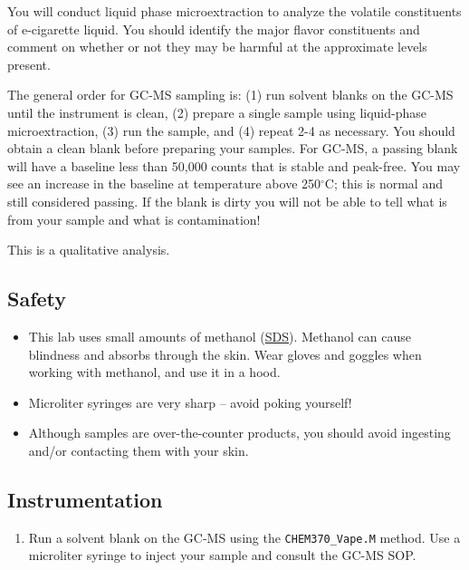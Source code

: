 \documentclass[]{tufte-book}
\providecommand{\tightlist}{%
  \setlength{\itemsep}{0pt}\setlength{\parskip}{0pt}}
\begin{document}
You will conduct liquid phase microextraction to analyze the volatile constituents of e-cigarette liquid. You should identify the major flavor constituents and comment on whether or not they may be harmful at the approximate levels present.

The general order for GC-MS sampling is: (1) run solvent blanks on the GC-MS until the instrument is clean, (2) prepare a single sample using liquid-phase microextraction, (3) run the sample, and (4) repeat 2-4 as necessary. You should obtain a clean blank before preparing your samples. For GC-MS, a passing blank will have a baseline less than 50,000 counts that is stable and peak-free. You may see an increase in the baseline at temperature above 250\(^{\circ}\)C; this is normal and still considered passing. If the blank is dirty you will not be able to tell what is from your sample and what is contamination!

This is a qualitative analysis.

\hypertarget{safety-1}{%
\subsection*{Safety}\label{safety-1}}

\begin{itemize}
\tightlist
\item
  This lab uses small amounts of methanol (\href{http://www.sciencelab.com/msds.php?msdsId=9927227}{SDS}). Methanol can cause blindness and absorbs through the skin. Wear gloves and goggles when working with methanol, and use it in a hood.\\
\item
  Microliter syringes are very sharp -- avoid poking yourself!
\item
  Although samples are over-the-counter products, you should avoid ingesting and/or contacting them with your skin.
\end{itemize}

\hypertarget{instrumentation}{%
\subsection{Instrumentation}\label{instrumentation}}

\begin{enumerate}
\def\labelenumi{\arabic{enumi}.}
\tightlist
\item
  Run a solvent blank on the GC-MS using the \texttt{CHEM370\_Vape.M} method. Use a microliter syringe to inject your sample and consult the GC-MS SOP.
\end{enumerate}
\end{document}
